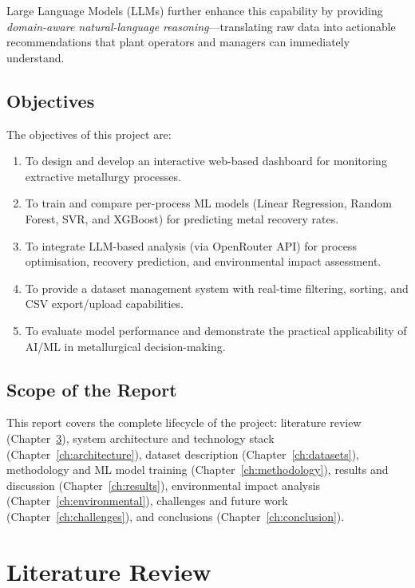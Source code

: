 \documentclass[12pt,a4paper]{report}
\begin{document}
Large Language Models (LLMs) further enhance this capability by providing \emph{domain-aware natural-language reasoning}—translating raw data into actionable recommendations that plant operators and managers can immediately understand.

\section{Objectives}

The objectives of this project are:

\begin{enumerate}
  \item To design and develop an interactive web-based dashboard for monitoring extractive metallurgy processes.
  \item To train and compare per-process ML models (Linear Regression, Random Forest, SVR, and XGBoost) for predicting metal recovery rates.
  \item To integrate LLM-based analysis (via OpenRouter API) for process optimisation, recovery prediction, and environmental impact assessment.
  \item To provide a dataset management system with real-time filtering, sorting, and CSV export/upload capabilities.
  \item To evaluate model performance and demonstrate the practical applicability of AI/ML in metallurgical decision-making.
\end{enumerate}

\section{Scope of the Report}

This report covers the complete lifecycle of the project: literature review (Chapter~\ref{ch:lit_review}), system architecture and technology stack (Chapter~\ref{ch:architecture}), dataset description (Chapter~\ref{ch:datasets}), methodology and ML model training (Chapter~\ref{ch:methodology}), results and discussion (Chapter~\ref{ch:results}), environmental impact analysis (Chapter~\ref{ch:environmental}), challenges and future work (Chapter~\ref{ch:challenges}), and conclusions (Chapter~\ref{ch:conclusion}).


\chapter{Literature Review}
\label{ch:lit_review}
\end{document}
